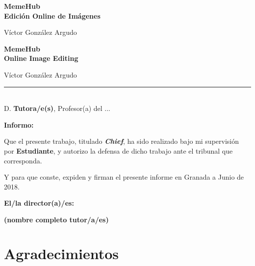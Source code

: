 \thispagestyle{empty}

\begin{center}
{\large\bfseries MemeHub \\ Edición Online de Imágenes }\\
\end{center}
\begin{center}
Víctor González Argudo\\
\end{center}


\vspace{0.5cm}
\vspace{0.7cm}

	

\cleardoublepage

\begin{center}
	{\large\bfseries MemeHub \\ Online Image Editing}\\
\end{center}
\begin{center}
	Víctor González Argudo\\
\end{center}
\vspace{0.5cm}
\vspace{0.7cm}



\cleardoublepage

\thispagestyle{empty}

\noindent\rule[-1ex]{\textwidth}{2pt}\\[4.5ex]

D. \textbf{Tutora/e(s)}, Profesor(a) del ...

\vspace{0.5cm}

\textbf{Informo:}

\vspace{0.5cm}

Que el presente trabajo, titulado \textit{\textbf{Chief}},
ha sido realizado bajo mi supervisión por \textbf{Estudiante}, y autorizo la defensa de dicho trabajo ante el tribunal
que corresponda.

\vspace{0.5cm}

Y para que conste, expiden y firman el presente informe en Granada a Junio de 2018.

\vspace{1cm}

\textbf{El/la director(a)/es: }

\vspace{5cm}

\noindent \textbf{(nombre completo tutor/a/es)}

\chapter*{Agradecimientos}




